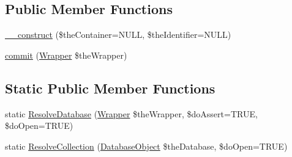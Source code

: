 \subsection*{Public Member Functions}
\begin{DoxyCompactItemize}
\item 
\hyperlink{class_ontology_wrapper_1_1_persistent_object_ac2375a2d3f51282a7d27bf62a3d3debc}{\-\_\-\-\_\-construct} (\$the\-Container=N\-U\-L\-L, \$the\-Identifier=N\-U\-L\-L)
\item 
\hyperlink{class_ontology_wrapper_1_1_persistent_object_ab9d702bee596c400b9403ea97583974e}{commit} (\hyperlink{class_ontology_wrapper_1_1_wrapper}{Wrapper} \$the\-Wrapper)
\end{DoxyCompactItemize}
\subsection*{Static Public Member Functions}
\begin{DoxyCompactItemize}
\item 
static \hyperlink{class_ontology_wrapper_1_1_persistent_object_a4103fc3005a33abe253a0a7250659da3}{Resolve\-Database} (\hyperlink{class_ontology_wrapper_1_1_wrapper}{Wrapper} \$the\-Wrapper, \$do\-Assert=T\-R\-U\-E, \$do\-Open=T\-R\-U\-E)
\item 
static \hyperlink{class_ontology_wrapper_1_1_persistent_object_a82580c299e95eda7cd28fa5bba1f8190}{Resolve\-Collection} (\hyperlink{class_ontology_wrapper_1_1_database_object}{Database\-Object} \$the\-Database, \$do\-Open=T\-R\-U\-E)
\end{DoxyCompactItemize}
